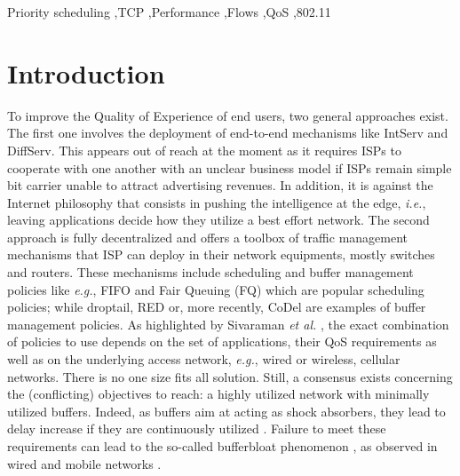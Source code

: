 \documentclass[preprint,12pt]{elsarticle}
\begin{document}
\begin{frontmatter}
\begin{keyword}
Priority scheduling \sep TCP \sep Performance \sep Flows \sep QoS \sep 802.11


\end{keyword}

\end{frontmatter}


\section{Introduction}
\label{sec:intro}


To improve the Quality of Experience of end users, two general approaches exist. The first one involves the deployment of end-to-end mechanisms like IntServ and DiffServ.  This appears out of reach at the moment as it requires ISPs to cooperate with one another with an unclear business model if ISPs remain simple bit carrier unable to attract advertising revenues. In addition, it is against the Internet philosophy that consists in pushing the intelligence at the edge, \textit{i.e.}, leaving applications decide how they utilize a best effort network. The second approach is fully decentralized and offers a toolbox of traffic management mechanisms that ISP can deploy in their network equipments, mostly switches and routers.  These mechanisms include  scheduling and buffer management policies like \textit{e.g.}, FIFO and Fair Queuing (FQ) which are popular scheduling policies; while droptail, RED \cite{Floyd93} or, more recently, CoDel \cite{Jacobson12} are examples of buffer management policies. As highlighted by Sivaraman \textit{et al.} \cite{sivaraman2013no}, the exact combination of policies to use depends on the set of applications, their QoS requirements as well as on the underlying access network, \textit{e.g.}, wired or wireless, cellular networks. There is no one size fits all solution. Still, a consensus exists concerning the (conflicting) objectives to reach: a highly utilized network with minimally utilized buffers. Indeed, as buffers aim at acting as shock absorbers, they lead to delay increase if they are continuously utilized \cite{Jacobson12}. Failure to meet these requirements can lead to the so-called bufferbloat phenomenon \cite{Gettys12}, as observed in wired and mobile networks \cite{BufferBloat_IMC_2012}.
\end{document}
